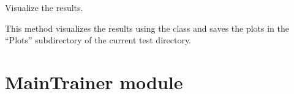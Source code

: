 \documentclass[letterpaper,10pt,english]{sphinxmanual}
\begin{document}
\begin{fulllineitems}
\begin{fulllineitems}
\end{fulllineitems}


\begin{fulllineitems}
\label{\detokenize{MainProgram:MainProgram.MainProgram.visualize}}
\pysigstartsignatures
{}
\pysigstopsignatures
\sphinxAtStartPar
Visualize the results.
\begin{description}
\sphinxAtStartPar
This method visualizes the results using the  class and saves the plots in the “Plots”
subdirectory of the current test directory.

\end{description}

\end{fulllineitems}


\end{fulllineitems}


\sphinxstepscope


\section{MainTrainer module}
\label{\detokenize{MainTrainer:module-MainTrainer}}\label{\detokenize{MainTrainer:maintrainer-module}}\label{\detokenize{MainTrainer::doc}}
\end{document}
